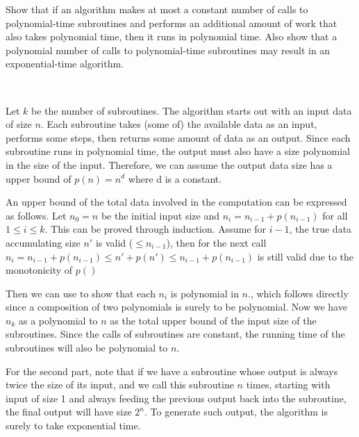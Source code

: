 \begin{exercise}[]{Show that if an algorithm makes at most a constant number of calls to polynomial-time subroutines and performs an additional amount of work that also takes polynomial time, then it runs in polynomial time. Also show that a polynomial number of calls to polynomial-time subroutines may result in an exponential-time algorithm.}
  \begin{solution}
  \par{~}

  Let $k$ be the number of subroutines. The algorithm starts out with an input data of size $n .$ Each subroutine takes (some of) the available data as an input, performs some steps, then returns some amount of data as an output. Since each subroutine runs in polynomial time, the output must also have a size polynomial in the size of the input. Therefore, we can assume the output data size has a upper bound of $p(n) = n^d$ where d is a constant.

  An upper bound of the total data involved in the computation can be expressed as follows. Let $n_{0}=n$ be the initial input size and $n_{i}=n_{i-1}+p\left(n_{i-1}\right)$ for all $1 \leq i \leq k .$ This can be proved through induction. Assume for $i-1$, the true data accumulating size $n'$ is valid ($\le{n_{i-1}}$), then for the next call $n_{i} = n_{i-1} + p(n_{i-1}) \le n' + p(n') \le n_{i-1} + p(n_{i-1})$ is still valid due to the  monotonicity of $p()$

  Then we can use to show that each $n_{i}$ is polynomial in $n .$, which follows directly since a composition of two polynomials is surely to be polynomial. Now we have $n_k$ as a polynomial to $n$ as the total upper bound of the input size of the subroutines. Since the calls of subroutines are constant, the running time of the subroutines will also be polynomial to $n$.
  
  For the second part, note that if we have a subroutine whose output is always twice the size of its input, and we call this subroutine $n$ times, starting with input of size 1 and always feeding the previous output back into the subroutine, the final output will have size $2^{n} .$ To generate such output, the algorithm is surely to take exponential time.


  \end{solution}
  \label{ex1}
\end{exercise}



